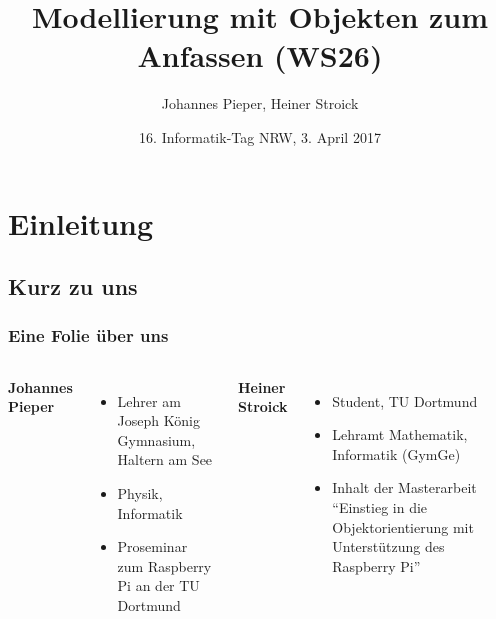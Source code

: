\documentclass[usenames,dvipsnames]{beamer}
\title[Objekte zum Anfassen]{Modellierung mit Objekten zum Anfassen (WS26)}
\author{Johannes Pieper, Heiner Stroick}
\date{16. Informatik-Tag NRW, 3. April 2017}
\begin{document}

\begin{frame}
\titlepage
\end{frame}




\section{Einleitung}


\subsection{Kurz zu uns}


\begin{frame}
\frametitle{Eine Folie über uns}

\begin{columns}[t]
\textbf{Johannes Pieper}
\begin{itemize}
\item Lehrer am Joseph König Gymnasium, Haltern am See
\item Physik, Informatik
\item Proseminar zum Raspberry Pi an der TU Dortmund
\end{itemize}

\textbf{Heiner Stroick}
\begin{itemize}
\item Student, TU Dortmund
\item Lehramt Mathematik, Informatik (GymGe)
\item Inhalt der Masterarbeit \enquote{Einstieg in die Objektorientierung mit Unterstützung des Raspberry Pi}
\end{itemize}
\end{columns}

\end{frame}

\end{document}
